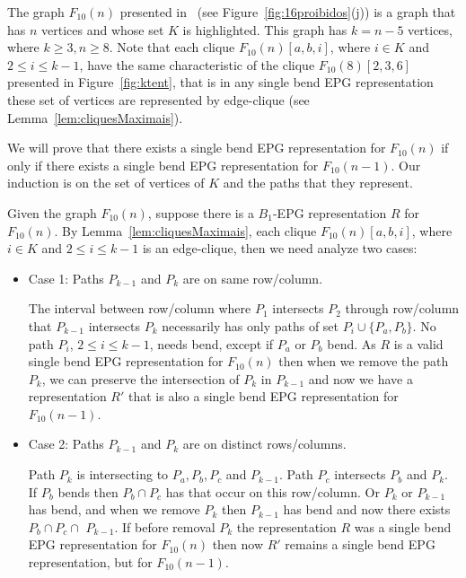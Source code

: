 \documentclass[9pt]{entcs}
\begin{document}
\begin{pf}
The graph $F_{10}(n)$ presented in~\cite{alcon2015characterizing} (see Figure~\ref{fig:16proibidos}(j)) is a graph that has $n$ vertices and whose set $K$ is highlighted. This graph has $k=n-5$ vertices, where $k\geq 3, n\geq 8$. Note that each clique $F_{10}(n)[a, b, i]$, where $i \in K$ and  $2\leq i \leq k-1$, have the same  characteristic of the clique $F_{10}(8)[2, 3, 6]$  presented in Figure~\ref{fig:ktent}, that is in any single bend EPG representation these set of vertices are represented by edge-clique (see Lemma~\ref{lem:cliquesMaximais}).

We will prove that there exists a single bend  EPG representation for $F_{10}(n)$ if only if there exists a single bend  EPG representation for $F_{10}(n-1)$. Our induction  is on the set of vertices of $K$ and the paths that they represent.

%

Given the graph $F_{10}(n)$, suppose there is a $B_1$-EPG representation $R$ for $F_{10}(n)$. By Lemma~\ref{lem:cliquesMaximais}, each clique $F_{10}(n)[a, b, i]$, where $i \in K$ and  $2\leq i \leq k-1$ is an edge-clique, then we need analyze two cases:

\begin{itemize}
    \item Case 1: Paths $\displaystyle P_{{k-1}}$ and $\displaystyle P_{{k}}$ are on same row/column.
    
    The interval between row/column where $ P_{{1}}$ intersects $ P_{{2}}$ through row/column that $ P_{{k-1}}$ intersects $ P_{{k}}$  necessarily has only paths of set $P_i \cup \{P_a,P_b\}$. No path $P_i$, $2 \leq i \leq k-1$, needs bend, except if $P_a$ or $P_b$ bend.
     As $R$ is a valid single bend EPG representation for $F_{10}(n)$ then when we remove the path $\displaystyle P_{{k}}$, we can preserve the intersection of $P_{{k}}$ in $P_{{k-1}}$ and now we have a representation $R'$ that is also a  single bend EPG representation for $F_{10}(n-1)$.
    
      \item Case 2: Paths $\displaystyle P_{{k-1}}$ and $\displaystyle P_{{k}}$ are on distinct rows/columns.
      
      Path $\displaystyle P_{{k}}$ is intersecting to $P_a, P_b, P_c$ and $\displaystyle P_{{k-1}}$. Path $P_c$ intersects $P_b$ and $\displaystyle P_{{k}}$. If $\displaystyle P_{b}$ bends then $P_b \cap P_c$ has that occur on this row/column. Or $\displaystyle P_{{k}}$ or $\displaystyle P_{{k-1}}$ has bend, and when we remove $\displaystyle P_{{k}}$ then $\displaystyle P_{{k-1}}$ has bend and now there exists $P_b \cap  P_c \cap $ $\displaystyle P_{{k-1}}$. If before removal $\displaystyle P_{{k}}$ the representation $R$ was a single bend EPG representation for $F_{10}(n)$ then now $R'$ remains a single bend EPG representation, but for $F_{10}(n-1)$.    
\end{itemize}


\end{pf}
\end{document}
